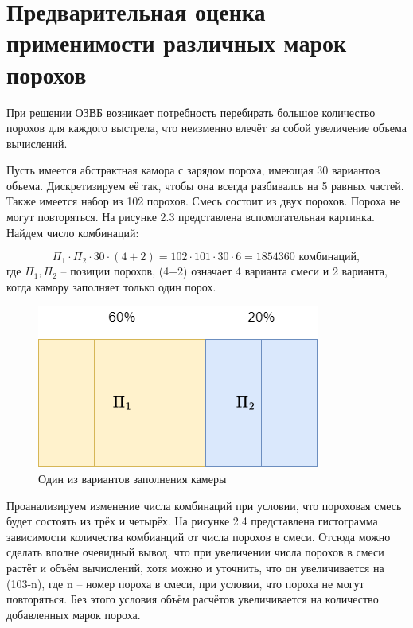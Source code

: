 \documentclass[14pt, a4paper]{extreport} %
\begin{document}
\section{Предварительная оценка применимости различных марок порохов}

При решении ОЗВБ возникает потребность перебирать большое количество порохов для каждого выстрела, что неизменно влечёт за собой увеличение объема вычислений.

Пусть имеется абстрактная камора с зарядом пороха, имеющая 30 вариантов объема. Дискретизируем её так, чтобы она всегда разбивалсь на 5 равных частей. Также имеется набор из 102 порохов. Смесь состоит из двух порохов. Пороха не могут повторяться. На рисунке 2.3 представлена вспомогательная картинка.
Найдем число комбинаций: 

\[
 \Pi_1 \cdot \Pi_2 \cdot 30 \cdot (4+2) = 102 \cdot 101 \cdot 30 \cdot 6 = 1854360 \text{ комбинаций},
\]
где $\Pi_1, \Pi_2$ -- позиции порохов, (4+2) означает 4 варианта смеси и 2 варианта, когда камору заполняет только один порох.

\begin{figure}[h]
\centering
\includegraphics[width=0.5\textheight]{imgs/KAMORA.png}
\caption{Один из вариантов заполнения камеры}
\end{figure}

Проанализируем изменение числа комбинаций при условии, что пороховая смесь будет состоять из трёх и четырёх. На рисунке 2.4 представлена гистограмма зависимости количества комбианций от числа порохов в смеси.
Отсюда можно сделать вполне очевидный вывод, что при увеличении числа порохов в смеси растёт и объём вычислений, хотя можно и уточнить, что он увеличивается на (103-n), где n -- номер пороха в смеси, при условии, что пороха не могут повторяться. Без
этого условия объём расчётов увеличивается на количество добавленных марок пороха.
\end{document}
